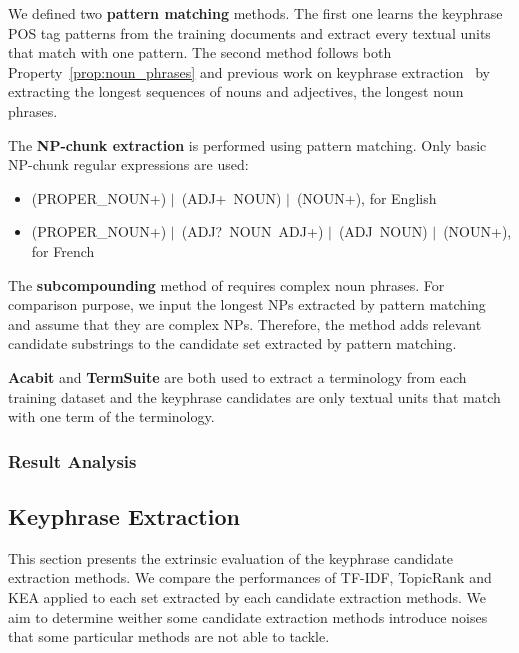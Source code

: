       We defined two \textbf{pattern matching} methods. The first one learns the
      keyphrase POS tag patterns from the training documents and extract every
      textual units that match with one pattern. The second method follows both
      Property~\ref{prop:noun_phrases} and previous work on keyphrase
      extraction~\cite{wan2008expandrank,bougouin2013topicrank} by extracting
      the longest sequences of nouns and adjectives, the longest noun phrases.

      The \textbf{NP-chunk extraction} is performed using pattern matching. Only
      basic NP-chunk regular expressions are used:
      \begin{itemize}
        \item{(PROPER\_NOUN+) $|$~(ADJ+~NOUN) $|$~(NOUN+), for English}
        \item{(PROPER\_NOUN+) $|$~(ADJ?~NOUN~ADJ+) $|$~(ADJ~NOUN) $|$~(NOUN+),
              for French}
      \end{itemize}

      The \textbf{subcompounding} method of
       requires complex noun phrases. For
      comparison purpose, we input the longest NPs extracted by pattern matching
      and assume that they are complex NPs. Therefore, the method adds relevant
      candidate substrings to the candidate set extracted by pattern matching.

      \textbf{Acabit} and \textbf{TermSuite} are both used to extract a
      terminology from each training dataset and the keyphrase candidates are
      only textual units that match with one term of the terminology.

    \subsubsection{Result Analysis}
    \label{subsubsec:candidate_extraction_result_analysis}

  \subsection{Keyphrase Extraction}
  \label{subsec:keyphrase_extraction}
    This section presents the extrinsic evaluation of the keyphrase candidate
    extraction methods. We compare the performances of TF-IDF, TopicRank and
    KEA applied to each set extracted by each candidate extraction methods. We
    aim to determine weither some candidate extraction methods introduce noises
    that some particular methods are not able to tackle.

